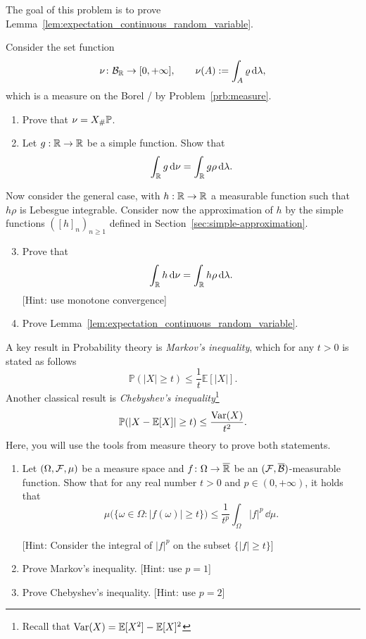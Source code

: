 \begin{problem}\label{prb:expectation_continuous_random_variable}
The goal of this problem is to prove Lemma~\ref{lem:expectation_continuous_random_variable}. 

Consider the set function
\[
	\nu\colon \mathcal B_{\mathbb R} \to [0,+\infty],\qquad\nu(A) := \int_A \varrho\, \mathrm{d} \lambda,
\]
which is a measure on the Borel \sigalg/ by Problem~\ref{prb:measure}.
\begin{enumerate}[label=(\alph*)]
\item Prove that $\nu = X_\# \mathbb P$.
\item Let $g : \mathbb R \to \mathbb R$ be a simple function. Show that
\[
	\int_{\mathbb R} g \, \mathrm{d} \nu = \int_{\mathbb R} g \rho \, \mathrm{d} \lambda.
\]
\end{enumerate}

Now consider the general case, with $h : \mathbb R \to \mathbb R$ a measurable function such that $h \rho$ is Lebesgue integrable. Consider now the approximation of $h$ by the simple functions $([h]_n)_{n \ge 1}$ defined in Section~\ref{sec:simple-approximation}.
\begin{enumerate}[label=(\alph*)]
\setcounter{enumi}{2}
\item Prove that 
\[
	\int_{\mathbb R} h \, \mathrm{d} \nu = \int_{\mathbb R} h \rho \, \mathrm{d} \lambda.
\]
[Hint: use monotone convergence]
\item Prove Lemma~\ref{lem:expectation_continuous_random_variable}.
\end{enumerate}
\end{problem}

\begin{problem}\label{prb:markov_chebyshev}
A key result in Probability theory is \emph{Markov's inequality}, which for any $t>0$ is stated as follows
\[
	\mathbb{P}(|X| \geq t) \leq \frac{1}{t} \mathbb{E}[|X|].
\]
Another classical result is \emph{Chebyshev's inequality}\footnote{Recall that $\mathrm{Var}(X) = \mathbb E[X^2] - \mathbb E[X]^2$}
\[
	\mathbb P(|X - \mathbb E[X]| \ge t) \le \frac{\mathrm{Var}(X)}{t^2}.
\]
Here, you will use the tools from measure theory to prove both statements.
\begin{enumerate}[label=(\alph*)]
\item Let $(\Omega,\mathcal F,\mu)$ be a measure space and $f\colon \Omega\to \overline{\mathbb R}$ be an $(\mathcal F,\overline{\mathcal B})$-measurable function. Show that for any real number $t>0$ and $p\in(0,+\infty)$, it holds that
\[
	\mu\bigl(\{\omega\in\Omega : |f(\omega)|\ge t\}\bigr) \le \frac{1}{t^p}\int_\Omega |f|^p\,\dd\mu.
\]

[Hint: Consider the integral of $|f|^p$ on the subset $\{|f|\ge t\}$]
\item Prove Markov's inequality. [Hint: use $p = 1$]
\item Prove Chebyshev's inequality. [Hint: use $p = 2$]
\end{enumerate}
\end{problem}
